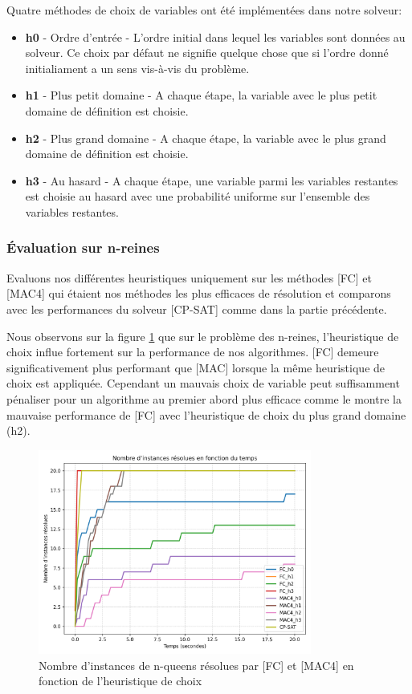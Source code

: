 \documentclass[14pt]{article}
\begin{document}
Quatre méthodes de choix de variables ont été implémentées dans notre solveur:
\begin{itemize}
	\item \textbf{h0} - Ordre d'entrée - L'ordre initial dans lequel les variables sont données au solveur. Ce choix par défaut ne signifie quelque chose que si l'ordre donné initialiament a un sens vis-à-vis du problème.
	\item \textbf{h1} - Plus petit domaine - A chaque étape, la variable avec le plus petit domaine de définition est choisie.
	\item \textbf{h2} - Plus grand domaine - A chaque étape, la variable avec le plus grand domaine de définition est choisie.
	\item \textbf{h3} - Au hasard - A chaque étape, une variable parmi les variables restantes est choisie au hasard avec une probabilité uniforme sur l'ensemble des variables restantes.
\end{itemize}


\subsubsection{Évaluation sur n-reines}

Evaluons nos différentes heuristiques uniquement sur les méthodes [FC] et [MAC4] qui étaient nos méthodes les plus efficaces de résolution et comparons avec les performances du solveur [CP-SAT] comme dans la partie précédente.

Nous observons sur la figure \ref{fig:n-queens-h1} que sur le problème des n-reines, l'heuristique de choix influe fortement sur la performance de nos algorithmes. [FC] demeure significativement plus performant que [MAC] lorsque la même heuristique de choix est appliquée. Cependant un mauvais choix de variable peut suffisamment pénaliser pour un algorithme au premier abord plus efficace comme le montre la mauvaise performance de [FC] avec l'heuristique de choix du plus grand domaine (h2).

\begin{figure}[H]
	\centering
	\includegraphics[width=0.8\textwidth]{Images/n-queens-h-MAC-FC.png}
	\caption{Nombre d'instances de n-queens résolues par [FC] et [MAC4] en fonction de l'heuristique de choix}
	\label{fig:n-queens-h1}
\end{figure}
\end{document}
